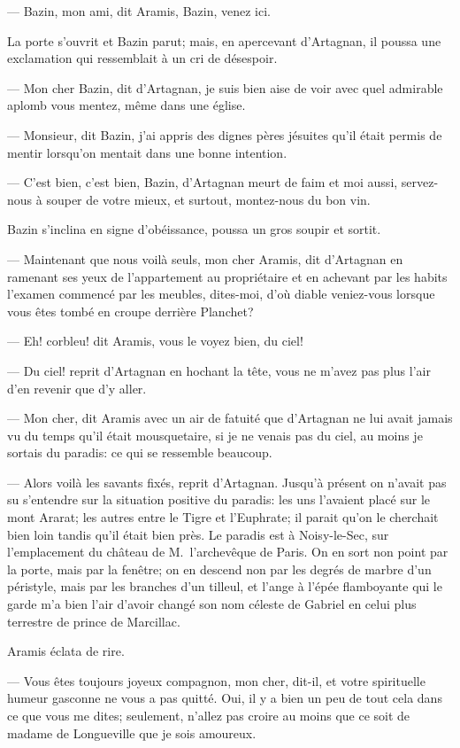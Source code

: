 — Bazin, mon ami, dit Aramis, Bazin, venez ici.

La porte s'ouvrit et Bazin parut; mais, en apercevant d'Artagnan, il poussa une exclamation qui ressemblait à un cri de désespoir.

— Mon cher Bazin, dit d'Artagnan, je suis bien aise de voir avec quel admirable aplomb vous mentez, même dans une église.

— Monsieur, dit Bazin, j'ai appris des dignes pères jésuites qu'il était permis de mentir lorsqu'on mentait dans une bonne intention.

— C'est bien, c'est bien, Bazin, d'Artagnan meurt de faim et moi aussi, servez-nous à souper de votre mieux, et surtout, montez-nous du bon vin.

Bazin s'inclina en signe d'obéissance, poussa un gros soupir et sortit.

— Maintenant que nous voilà seuls, mon cher Aramis, dit d'Artagnan en ramenant ses yeux de l'appartement au propriétaire et en achevant par les habits l'examen commencé par les meubles, dites-moi, d'où diable veniez-vous lorsque vous êtes tombé en croupe derrière Planchet?

— Eh! corbleu! dit Aramis, vous le voyez bien, du ciel!

— Du ciel! reprit d'Artagnan en hochant la tête, vous ne m'avez pas plus l'air d'en revenir que d'y aller.

— Mon cher, dit Aramis avec un air de fatuité que d'Artagnan ne lui avait jamais vu du temps qu'il était mousquetaire, si je ne venais pas du ciel, au moins je sortais du paradis: ce qui se ressemble beaucoup.

— Alors voilà les savants fixés, reprit d'Artagnan. Jusqu'à présent on n'avait pas su s'entendre sur la situation positive du paradis: les uns l'avaient placé sur le mont Ararat; les autres entre le Tigre et l'Euphrate; il parait qu'on le cherchait bien loin tandis qu'il était bien près. Le paradis est à Noisy-le-Sec, sur l'emplacement du château de M.~l'archevêque de Paris. On en sort non point par la porte, mais par la fenêtre; on en descend non par les degrés de marbre d'un péristyle, mais par les branches d'un tilleul, et l'ange à l'épée flamboyante qui le garde m'a bien l'air d'avoir changé son nom céleste de Gabriel en celui plus terrestre de prince de Marcillac.

Aramis éclata de rire.

— Vous êtes toujours joyeux compagnon, mon cher, dit-il, et votre spirituelle humeur gasconne ne vous a pas quitté. Oui, il y a bien un peu de tout cela dans ce que vous me dites; seulement, n'allez pas croire au moins que ce soit de madame de Longueville que je sois amoureux.

